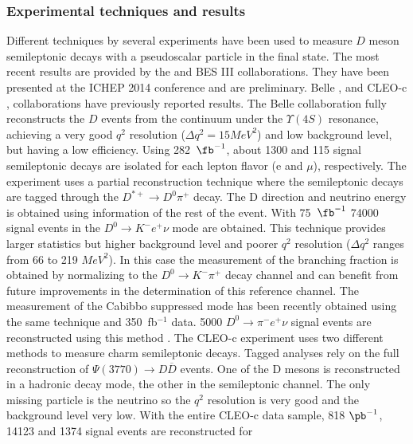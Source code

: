 \subsubsection{Experimental techniques and results}
 Different techniques by several experiments have been used to measure $D$ meson semileptonic decays with a 
pseudoscalar particle in the final state. The most recent results are provided by the \babar and BES III collaborations.
They have been presented at the ICHEP 2014 conference and are preliminary.  
Belle \cite{Widhalm:2006wz}, \babar \cite{Aubert:2007wg} and CLEO-c \cite{Besson:2009uv},\cite{Dobbs:2007aa} 
collaborations have previously reported results. 
The Belle collaboration fully reconstructs the $D$ events from the continuum under the $\Upsilon(4S)$ resonance, 
achieving a very good $q^2$ resolution ($\Delta q^2 = 15 MeV^2$) and low background level, 
but having a low efficiency. Using 282~$\fb^{-1}$, about 1300 and 115 signal semileptonic decays are 
isolated for each lepton flavor (e and $\mu$), respectively. 
The \babar experiment uses a partial reconstruction technique where the semileptonic decays are tagged 
through the $ D^{\ast +}\to D^0\pi^+$ decay. 
The D direction and neutrino energy is obtained using information of the rest of the event. 
With 75~$\fb^{-1}$ 74000 signal events in the $D^0 \to {K}^- e^+ \nu$ mode are obtained. 
This technique provides larger statistics but higher background level and poorer $q^2$ resolution ($\Delta q^2$ ranges from 66 to 219 $MeV^2$). In this case the measurement of the branching fraction is obtained by normalizing to the $D^0 \to K^- \pi^+$ decay channel and can benefit from future improvements in the determination of this reference channel. The measurement of the Cabibbo suppressed mode has been recently obtained 
using the same technique and 350~fb$^{-1}$ data. 5000 $D^0 \to {\pi}^- e^+ \nu$ signal events are reconstructed using this method \cite{babar-new}.  
The CLEO-c experiment uses two different methods to measure charm semileptonic decays. 
Tagged analyses \cite{Besson:2009uv} rely on the full reconstruction of $\Psi(3770)\to D {\overline D}$ events. One of the D mesons is reconstructed in a hadronic decay mode, the other in the semileptonic channel. The only missing particle is the neutrino so the $q^2$ resolution is very good and the background level very low.   
With the entire CLEO-c data sample, 818 $\pb^{-1}$, 14123 and 1374 signal events are reconstructed for 
